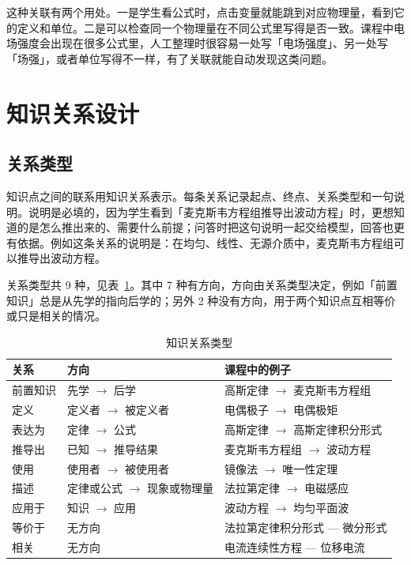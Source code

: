 \documentclass[UTF8,a4paper,zihao=-4]{ctexart}
\begin{document}
这种关联有两个用处。一是学生看公式时，点击变量就能跳到对应物理量，看到它的定义和单位。二是可以检查同一个物理量在不同公式里写得是否一致。课程中电场强度会出现在很多公式里，人工整理时很容易一处写「电场强度」、另一处写「场强」，或者单位写得不一样，有了关联就能自动发现这类问题。

\section{知识关系设计}

\subsection{关系类型}

知识点之间的联系用知识关系表示。每条关系记录起点、终点、关系类型和一句说明。说明是必填的，因为学生看到「麦克斯韦方程组推导出波动方程」时，更想知道的是怎么推出来的、需要什么前提；问答时把这句说明一起交给模型，回答也更有依据。例如这条关系的说明是：在均匀、线性、无源介质中，麦克斯韦方程组可以推导出波动方程。

关系类型共 9 种，见表~\ref{tab:relations}。其中 7 种有方向，方向由关系类型决定，例如「前置知识」总是从先学的指向后学的；另外 2 种没有方向，用于两个知识点互相等价或只是相关的情况。

\begin{table}[!htbp]
\centering
\caption{知识关系类型}
\label{tab:relations}
\small
\begin{tabular}{lll}
\toprule
\textbf{关系} & \textbf{方向} & \textbf{课程中的例子} \\
\midrule
前置知识 & 先学 $\rightarrow$ 后学 & 高斯定律 $\rightarrow$ 麦克斯韦方程组 \\
定义 & 定义者 $\rightarrow$ 被定义者 & 电偶极子 $\rightarrow$ 电偶极矩 \\
表达为 & 定律 $\rightarrow$ 公式 & 高斯定律 $\rightarrow$ 高斯定律积分形式 \\
推导出 & 已知 $\rightarrow$ 推导结果 & 麦克斯韦方程组 $\rightarrow$ 波动方程 \\
使用 & 使用者 $\rightarrow$ 被使用者 & 镜像法 $\rightarrow$ 唯一性定理 \\
描述 & 定律或公式 $\rightarrow$ 现象或物理量 & 法拉第定律 $\rightarrow$ 电磁感应 \\
应用于 & 知识 $\rightarrow$ 应用 & 波动方程 $\rightarrow$ 均匀平面波 \\
\midrule
等价于 & 无方向 & 法拉第定律积分形式 — 微分形式 \\
相关 & 无方向 & 电流连续性方程 — 位移电流 \\
\bottomrule
\end{tabular}
\end{table}
\end{document}
